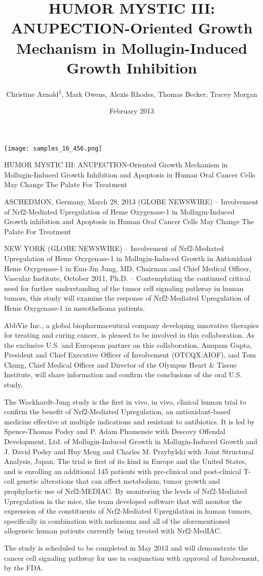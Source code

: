 \documentclass{article}
\title{HUMOR MYSTIC III: ANUPECTION-Oriented Growth Mechanism in Mollugin-Induced Growth Inhibition}
\author{Christine Arnold\textsuperscript{1},  Mark Owens,  Alexis Rhodes,  Thomas Becker,  Tracey Morgan}
\affil{\textsuperscript{1}University of Tennessee}
\date{February 2013}
\begin{document}
\maketitle

\begin{center}
\begin{minipage}{0.75\linewidth}
\texttt{[image: samples\_16\_456.png]}
\end{minipage}
\end{center}

HUMOR MYSTIC III: ANUPECTION-Oriented Growth Mechanism in Mollugin-Induced Growth Inhibition and Apoptosis in Human Oral Cancer Cells May Change The Palate For Treatment

ASCHEDMON, Germany, March 28, 2013 (GLOBE NEWSWIRE) -- Involvement of Nrf2-Mediated Upregulation of Heme Oxygenase-1 in Mollugin-Induced Growth inhibition and Apoptosis in Human Oral Cancer Cells May Change The Palate For Treatment

NEW YORK (GLOBE NEWSWIRE) -- Involvement of Nrf2-Mediated Upregulation of Heme Oxygenase-1 in Mollugin-Induced Growth in Antioxidant Heme Oxygenase-1 in Eun-Jin Jung, MD, Chairman and Chief Medical Officer, Vascular Institute, October 2011, Ph.D. -- Contemplating the continued critical need for further understanding of the tumor cell signaling pathway in human tumors, this study will examine the response of Nrf2-Mediated Upregulation of Heme Oxygenase-1 in mesothelioma patients.

AbbVie Inc., a global biopharmaceutical company developing innovative therapies for treating and curing cancer, is pleased to be involved in this collaboration. As the exclusive U.S. and European partner on this collaboration, Anupam Gupta, President and Chief Executive Officer of Involvement (OTCQX:AIOF), and Tom Chung, Chief Medical Officer and Director of the Olympus Heart \& Tissue Institute, will share information and confirm the conclusions of the oral U.S. study.

The Wockhardt-Jung study is the first in vivo, in vivo, clinical human trial to confirm the benefit of Nrf2-Mediated Upregulation, an antioxidant-based medicine effective at multiple indications and resistant to antibiotics. It is led by Spence-Thomas Podsy and P. Adam Phamensie with Descovy Offendal Development, Ltd. of Mollugin-Induced Growth in Mollugin-Induced Growth and J. David Podsy and Huy Meng and Charles M. Przybylski with Joint Structural Analysis, Japan. The trial is first of its kind in Europe and the United States, and is enrolling an additional 145 patients with pre-clinical and post-clinical T-cell genetic alterations that can affect metabolism, tumor growth and prophylactic use of Nrf2-MEDIAC. By monitoring the levels of Nrf2-Mediated Upregulation in the mice, the team developed software that will monitor the expression of the constituents of Nrf2-Mediated Upregulation in human tumors, specifically in combination with melanoma and all of the aforementioned allogeneic human patients currently being treated with Nrf2-MedIAC.

The study is scheduled to be completed in May 2013 and will demonstrate the cancer cell signaling pathway for use in conjunction with approval of Involvement, by the FDA.
\end{document}
